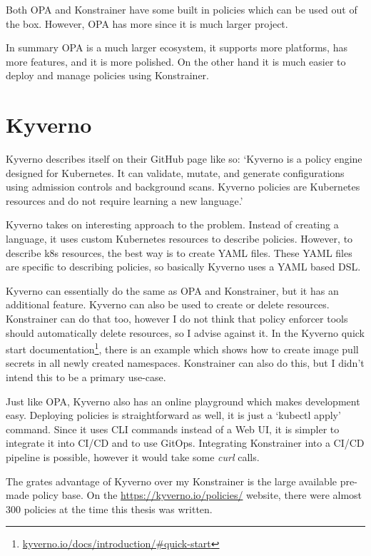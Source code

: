 Both OPA and Konstrainer have some built in policies which can be used out of the box. However, OPA has more since it is much larger project.

In summary OPA is a much larger ecosystem, it supports more platforms, has more features, and it is more polished. On the other hand it is much easier to deploy and manage policies using Konstrainer.

\section{Kyverno}

Kyverno describes itself on their GitHub page like so:
`Kyverno is a policy engine designed for Kubernetes. It can validate, mutate, and generate configurations using admission controls and background scans. Kyverno policies are Kubernetes resources and do not require learning a new language.' \cite{Kyverno}

Kyverno takes on interesting approach to the problem. Instead of creating a language, it uses custom Kubernetes resources to describe policies. However, to describe k8s resources, the best way is to create YAML files. These YAML files are specific to describing policies, so basically Kyverno uses a YAML based DSL.

Kyverno can essentially do the same as OPA and Konstrainer, but it has an additional feature. Kyverno can also be used to create or delete resources. Konstrainer can do that too, however I do not think that policy enforcer tools should automatically delete resources, so I advise against it. In the Kyverno quick start documentation\footnote{\url{kyverno.io/docs/introduction/\#quick-start}}, there is an example which shows how to create image pull secrets in all newly created namespaces. Konstrainer can also do this, but I didn't intend this to be a primary use-case.

Just like OPA, Kyverno also has an online playground which makes development easy. Deploying policies is straightforward as well, it is just a `kubectl apply' command. Since it uses CLI commands instead of a Web UI, it is simpler to integrate it into CI/CD and to use GitOps. Integrating Konstrainer into a CI/CD pipeline is possible, however it would take some \emph{curl} calls.

The grates advantage of Kyverno over my Konstrainer is the large available pre-made policy base. On the \url{https://kyverno.io/policies/} website, there were almost 300 policies at the time this thesis was written.

